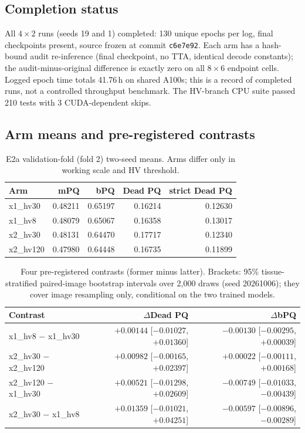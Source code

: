 \documentclass[11pt,a4paper]{article}
\newcommand{\code}[1]{\nolinkurl{#1}}
\begin{document}
\subsection{Completion status}

All $4\times2$ runs (seeds 19 and 1) completed: 130 unique epochs per log, final checkpoints present, source frozen at commit \code{c6e7e92}. Each arm has a hash-bound audit re-inference (final checkpoint, no TTA, identical decode constants); the audit-minus-original difference is exactly zero on all $8\times6$ endpoint cells. Logged epoch time totals 41.76\,h on shared A100s; this is a record of completed runs, not a controlled throughput benchmark. The HV-branch CPU suite passed 210 tests with 3 CUDA-dependent skips.

\subsection{Arm means and pre-registered contrasts}

\begin{table}[H]
\centering\small
\caption{E2a validation-fold (fold 2) two-seed means. Arms differ only in working scale and HV threshold.}
\label{tab:e2aarms}
\begin{tabular}{lrrrr}\toprule
Arm & mPQ & bPQ & Dead PQ & strict Dead PQ\\\midrule
x1\_hv30 & 0.48211 & 0.65197 & 0.16214 & 0.12630\\
x1\_hv8 & 0.48079 & 0.65067 & 0.16358 & 0.13017\\
x2\_hv30 & 0.48131 & 0.64470 & 0.17717 & 0.12340\\
x2\_hv120 & 0.47980 & 0.64448 & 0.16735 & 0.11899\\\bottomrule
\end{tabular}
\end{table}

\begin{table}[H]
\centering\small
\caption{Four pre-registered contrasts (former minus latter). Brackets: 95\% tissue-stratified paired-image bootstrap intervals over 2,000 draws (seed 20261006); they cover image resampling only, conditional on the two trained models.}
\label{tab:e2acontrasts}
\begin{tabular}{lrr}\toprule
Contrast & $\Delta$Dead PQ & $\Delta$bPQ\\\midrule
x1\_hv8 $-$ x1\_hv30 & $+0.00144$ [$-0.01027$, $+0.01360$] & $-0.00130$ [$-0.00295$, $+0.00039$]\\
x2\_hv30 $-$ x2\_hv120 & $+0.00982$ [$-0.00165$, $+0.02397$] & $+0.00022$ [$-0.00111$, $+0.00168$]\\
x2\_hv120 $-$ x1\_hv30 & $+0.00521$ [$-0.01298$, $+0.02609$] & $-0.00749$ [$-0.01033$, $-0.00439$]\\
x2\_hv30 $-$ x1\_hv8 & $+0.01359$ [$-0.01021$, $+0.04251$] & $-0.00597$ [$-0.00896$, $-0.00289$]\\\bottomrule
\end{tabular}
\end{table}
\end{document}
